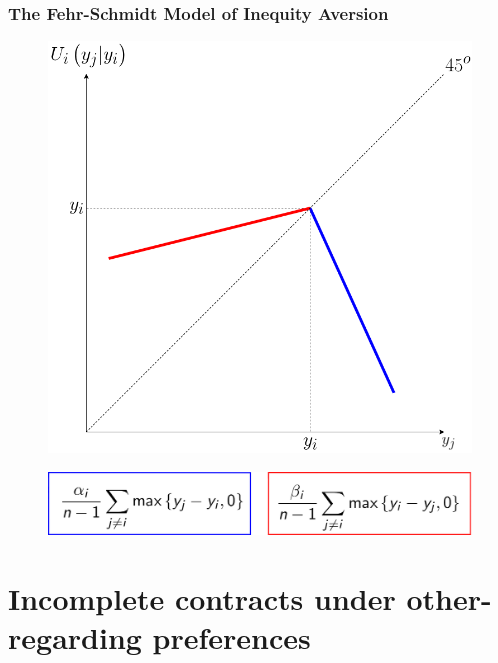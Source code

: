 \documentclass{beamer}
\begin{document}
\begin{frame}
	\frametitle{The Fehr-Schmidt Model of Inequity Aversion}
	\begin{center}
		\begin{figure}

			\includegraphics[scale=0.245]{fehrschmidt.png}

		\end{figure}
	\end{center}
	\begin{center}
	\begin{figure}
		\includegraphics[scale=0.15]{eq.png}
	\end{figure}
\end{center}

	
\end{frame}


\section{Incomplete contracts under other-regarding preferences}

\end{document}
